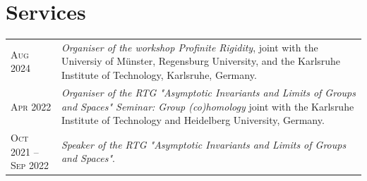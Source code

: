 \documentclass[a4paper,10pt]{article} %
\begin{document}
	
\section{Services}

\begin{longtable}{>{\raggedleft\arraybackslash}p{4.2cm}p{10cm}}

    \textsc{Aug 2024} & \emph{Organiser of the workshop Profinite Rigidity}, joint with the Universiy of Münster, Regensburg University, and the Karlsruhe Institute of Technology, Karlsruhe, Germany.\\

    \textsc{Apr 2022} & \emph{Organiser of the RTG "Asymptotic Invariants and Limits of Groups and Spaces"
    Seminar: Group (co)homology} joint with the Karlsruhe Institute of Technology and Heidelberg University, Germany.\\

    \textsc{Oct 2021 -- Sep 2022} & \emph{Speaker of the RTG "Asymptotic Invariants and Limits of Groups and Spaces"}.\\

\end{longtable}


%
%
%
\end{document}
